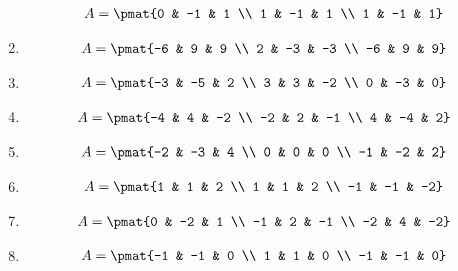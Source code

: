 \begin{enumerate}
\begin{align*}
A = \pmat{0 & -1 & 1 \\ 1 & -1 & 1 \\ 1 & -1 & 1}
\end{align*}

\item

\begin{align*}
A = \pmat{-6 & 9 & 9 \\ 2 & -3 & -3 \\ -6 & 9 & 9}
\end{align*}

\item

\begin{align*}
A = \pmat{-3 & -5 & 2 \\ 3 & 3 & -2 \\ 0 & -3 & 0}
\end{align*}

\item

\begin{align*}
A = \pmat{-4 & 4 & -2 \\ -2 & 2 & -1 \\ 4 & -4 & 2}
\end{align*}

\item

\begin{align*}
A = \pmat{-2 & -3 & 4 \\ 0 & 0 & 0 \\ -1 & -2 & 2}
\end{align*}

\item

\begin{align*}
A = \pmat{1 & 1 & 2 \\ 1 & 1 & 2 \\ -1 & -1 & -2}
\end{align*}

\item

\begin{align*}
A = \pmat{0 & -2 & 1 \\ -1 & 2 & -1 \\ -2 & 4 & -2}
\end{align*}

\item

\begin{align*}
A = \pmat{-1 & -1 & 0 \\ 1 & 1 & 0 \\ -1 & -1 & 0}
\end{align*}


\end{enumerate}
